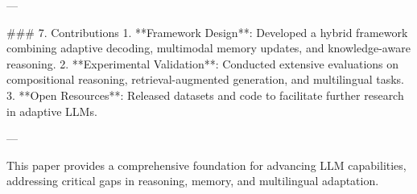 ---

### 7. Contributions
1. **Framework Design**: Developed a hybrid framework combining adaptive decoding, multimodal memory updates, and knowledge-aware reasoning.
2. **Experimental Validation**: Conducted extensive evaluations on compositional reasoning, retrieval-augmented generation, and multilingual tasks.
3. **Open Resources**: Released datasets and code to facilitate further research in adaptive LLMs.

--- 

This paper provides a comprehensive foundation for advancing LLM capabilities, addressing critical gaps in reasoning, memory, and multilingual adaptation.
